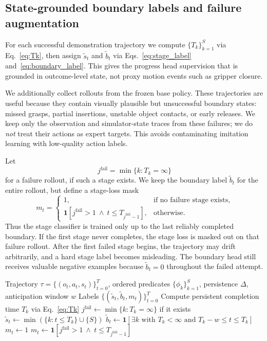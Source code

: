 \documentclass[10pt]{article}
\newcommand{\Sstages}{S}
\newcommand{\bt}{\tilde{b}_t}
\newcommand{\st}{\tilde{s}_t}
\newcommand{\one}{\mathbf{1}}
\begin{document}
\subsection{State-grounded boundary labels and failure augmentation}
\label{sec:labels}

For each successful demonstration trajectory we compute
$\{T_k\}_{k=1}^{\Sstages}$ via Eq.~\eqref{eq:Tk}, then assign $\st$ and $\bt$
via Eqs.~\eqref{eq:stage_label} and~\eqref{eq:boundary_label}.
This gives the progress head supervision that is grounded in outcome-level
state, not proxy motion events such as gripper closure.

We additionally collect rollouts from the frozen base policy.
These trajectories are useful because they contain visually plausible but
unsuccessful boundary states: missed grasps, partial insertions, unstable object
contacts, or early releases.
We keep only the observation and simulator-state traces from these failures;
we do \emph{not} treat their actions as expert targets.
This avoids contaminating imitation learning with low-quality action labels.

Let
\[
  j^{\mathrm{fail}} = \min\{k : T_k = \infty\}
\]
for a failure rollout, if such a stage exists.
We keep the boundary label $\bt$ for the entire rollout, but define a stage-loss
mask
\begin{equation}
  m_t =
  \begin{cases}
    1, & \text{if no failure stage exists},\\
    \one[j^{\mathrm{fail}}>1 \ \wedge\  t \le T_{j^{\mathrm{fail}}-1}], & \text{otherwise.}
  \end{cases}
  \label{eq:mask}
\end{equation}
Thus the stage classifier is trained only up to the last reliably completed
boundary. If the first stage never completes, the stage loss is masked out on
that failure rollout. After the first failed stage begins, the trajectory may
drift arbitrarily, and a
hard stage label becomes misleading.
The boundary head still receives valuable negative examples because $\bt=0$
throughout the failed attempt.

\begin{algorithm}[t]
\caption{Predicate-based stage and boundary labeling}
\label{alg:labels}
\begin{algorithmic}[1]
\Require Trajectory $\tau=\{(o_t,a_t,s_t)\}_{t=0}^{T}$, ordered predicates
         $\{\phi_k\}_{k=1}^{\Sstages}$, persistence $\Delta$, anticipation window $w$
\Ensure Labels $\{(\st,\bt,m_t)\}_{t=0}^{T}$
\For{$k=1$ to $\Sstages$}
  \State Compute persistent completion time $T_k$ via Eq.~\eqref{eq:Tk}
\EndFor
\State $j^{\mathrm{fail}} \gets \min\{k : T_k=\infty\}$ if it exists
  \State $\st \gets \min(\{k : t \le T_k\} \cup \{\Sstages\})$
  \State $\bt \gets \one[\exists k \text{ with } T_k<\infty \text{ and } T_k-w \le t \le T_k]$
    \State $m_t \gets 1$
  \Else
    \State $m_t \gets \one[j^{\mathrm{fail}}>1 \ \wedge\ t \le T_{j^{\mathrm{fail}}-1}]$
  \EndIf
\EndFor
\end{algorithmic}
\end{algorithm}
\end{document}
